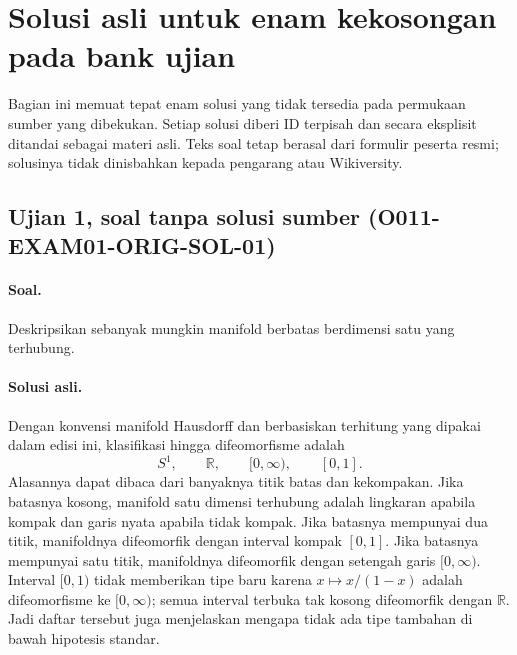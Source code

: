 
\section{Solusi asli untuk enam kekosongan pada bank ujian}
\label{o011-exam-original-repairs}

Bagian ini memuat tepat enam solusi yang tidak tersedia pada permukaan sumber
yang dibekukan. Setiap solusi diberi ID terpisah dan secara eksplisit ditandai
sebagai materi asli. Teks soal tetap berasal dari formulir peserta resmi;
solusinya tidak dinisbahkan kepada pengarang atau Wikiversity.

\subsection*{Ujian 1, soal tanpa solusi sumber (O011-EXAM01-ORIG-SOL-01)}
\label{o011-exam01-orig-sol-01}

\paragraph{Soal.}
Deskripsikan sebanyak mungkin manifold berbatas berdimensi satu yang
terhubung.

\paragraph{Solusi asli.}
Dengan konvensi manifold Hausdorff dan berbasiskan terhitung yang dipakai
dalam edisi ini, klasifikasi hingga difeomorfisme adalah
\[
 S^1,\qquad \mathbb R,\qquad [0,\infty),\qquad [0,1].
\]
Alasannya dapat dibaca dari banyaknya titik batas dan kekompakan. Jika
batasnya kosong, manifold satu dimensi terhubung adalah lingkaran apabila
kompak dan garis nyata apabila tidak kompak. Jika batasnya mempunyai dua titik,
manifoldnya difeomorfik dengan interval kompak $[0,1]$. Jika batasnya mempunyai
satu titik, manifoldnya difeomorfik dengan setengah garis $[0,\infty)$.
Interval $[0,1)$ tidak memberikan tipe baru karena
$x\mapsto x/(1-x)$ adalah difeomorfisme ke $[0,\infty)$; semua interval terbuka
tak kosong difeomorfik dengan $\mathbb R$. Jadi daftar tersebut juga menjelaskan
mengapa tidak ada tipe tambahan di bawah hipotesis standar.

